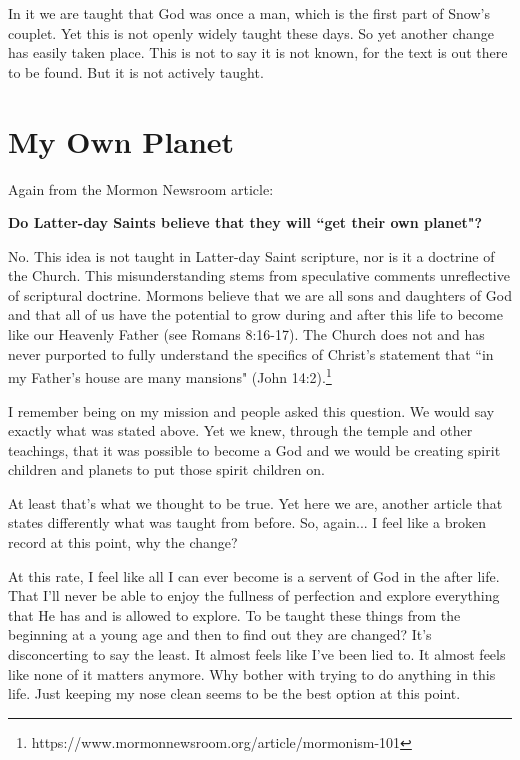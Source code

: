 \documentclass{article}
\begin{document}
In it we are taught that God was once a man, which is the first part of Snow's 
couplet. Yet this is not openly widely taught these days. So yet another change 
has easily taken place. This is not to say it is not known, for the text is out 
there to be found. But it is not actively taught.

\newpage

\section{My Own Planet}

Again from the Mormon Newsroom article:

\begin{displayquote}
\textbf{Do Latter-day Saints believe that they will ``get their own planet"?}

No. This idea is not taught in Latter-day Saint scripture, nor is it a doctrine 
of the Church. This misunderstanding stems from speculative comments 
unreflective of scriptural doctrine. Mormons believe that we are all sons and 
daughters of God and that all of us have the potential to grow during and after 
this life to become like our Heavenly Father (see Romans 8:16-17). The Church 
does not and has never purported to fully understand the specifics of Christ’s 
statement that ``in my Father's house are many mansions" 
(John 14:2).\footnote{https://www.mormonnewsroom.org/article/mormonism-101}
\end{displayquote}

I remember being on my mission and people asked this question. We would say 
exactly what was stated above. Yet we knew, through the temple and other 
teachings, that it was possible to become a God and we would be creating 
spirit children and planets to put those spirit children on.

At least that's what we thought to be true. Yet here we are, another article
that states differently what was taught from before. So, again... I feel like
a broken record at this point, why the change?

At this rate, I feel like all I can ever become is a servent of God in the 
after life. That I'll never be able to enjoy the fullness of perfection and
explore everything that He has and is allowed to explore. To be taught 
these things from the beginning at a young age and then to find out they 
are changed? It's disconcerting to say the least. It almost feels like I've been
lied to. It almost feels like none of it matters anymore. Why bother with trying
to do anything in this life. Just keeping my nose clean seems to be the best
option at this point.
\end{document}
